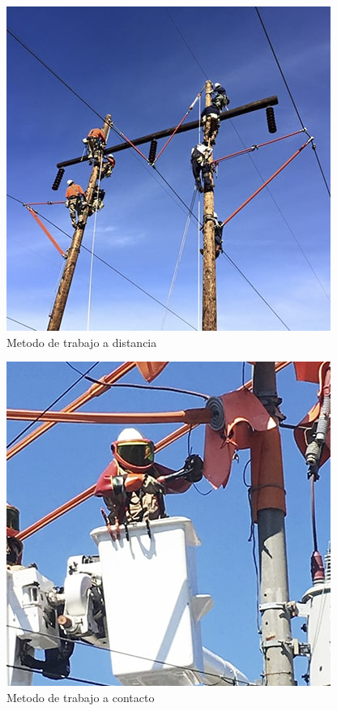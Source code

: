 \documentclass[a5paper]{book}%
\begin{document}
        \begin{figure}[H]
          \centering
          \caption{Metodo de trabajo a distancia}
          \label{fig:trabajoadistancia}
          \includegraphics[width=\linewidth]{trabajo_distancia}
        \end{figure}


        \begin{figure}[H]
          \centering
          \caption{Metodo de trabajo a contacto}
          \label{fig:trabajocontacto}
          \includegraphics[width=\linewidth]{trabajo_contacto}
        \end{figure}
\end{document}
